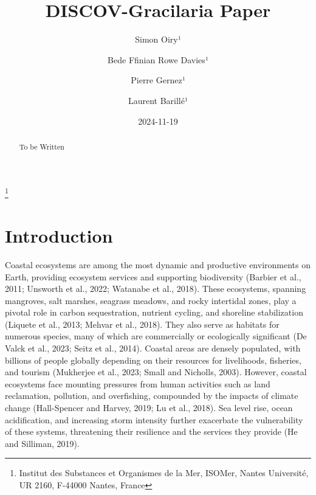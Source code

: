 \documentclass[
  letterpaper,
  DIV=11,
  numbers=noendperiod]{scrartcl}
\title{DISCOV-Gracilaria Paper}
\author{Simon Oiry¹ \and Bede Ffinian Rowe Davies¹ \and Pierre
Gernez¹ \and Laurent Barillé¹}
\date{2024-11-19}
\begin{document}
\maketitle
\begin{abstract}
To be Written
\end{abstract}


\footnote{Institut des Substances et Organismes de la Mer, ISOMer,
  Nantes Université, UR 2160, F-44000 Nantes, France}

\section{Introduction}\label{introduction}

Coastal ecosystems are among the most dynamic and productive
environments on Earth, providing ecosystem services and supporting
biodiversity (Barbier et al., 2011; Unsworth et al., 2022; Watanabe et
al., 2018). These ecosystems, spanning mangroves, salt marshes, seagrass
meadows, and rocky intertidal zones, play a pivotal role in carbon
sequestration, nutrient cycling, and shoreline stabilization (Liquete et
al., 2013; Mehvar et al., 2018). They also serve as habitats for
numerous species, many of which are commercially or ecologically
significant (De Valck et al., 2023; Seitz et al., 2014). Coastal areas
are densely populated, with billions of people globally depending on
their resources for livelihoods, fisheries, and tourism (Mukherjee et
al., 2023; Small and Nicholls, 2003). However, coastal ecosystems face
mounting pressures from human activities such as land reclamation,
pollution, and overfishing, compounded by the impacts of climate change
(Hall-Spencer and Harvey, 2019; Lu et al., 2018). Sea level rise, ocean
acidification, and increasing storm intensity further exacerbate the
vulnerability of these systems, threatening their resilience and the
services they provide (He and Silliman, 2019).
\end{document}
